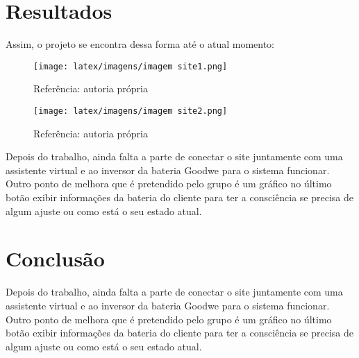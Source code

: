 \documentclass{tcc}
\begin{document}
\newpage

\section{Resultados}
Assim, o projeto se encontra dessa forma até o atual momento:

\begin{figure}[H]
    \centering
    \texttt{[image: latex/imagens/imagem site1.png]}
    \caption{Referência: autoria própria}
    \label{fig:bad_images}
\end{figure}


\begin{figure}[H]
    \centering
    \texttt{[image: latex/imagens/imagem site2.png]}
    \caption{Referência: autoria própria}
    \label{fig:bad_images}
\end{figure}


Depois do trabalho, ainda falta a parte de conectar o site juntamente com uma assistente virtual e ao inversor da bateria Goodwe para o sistema funcionar. Outro ponto de melhora que é pretendido pelo grupo é um gráfico no último botão exibir informações da bateria do cliente para ter a consciência se precisa de algum ajuste ou como está o seu estado atual.


\newpage

\section{Conclusão}
Depois do trabalho, ainda falta a parte de conectar o site juntamente com uma assistente virtual e ao inversor da bateria Goodwe para o sistema funcionar. Outro ponto de melhora que é pretendido pelo grupo é um gráfico no último botão exibir informações da bateria do cliente para ter a consciência se precisa de algum ajuste ou como está o seu estado atual.


\pagestyle{plain} %
\tableofcontents

\newpage

\printbibliography
\end{document}
